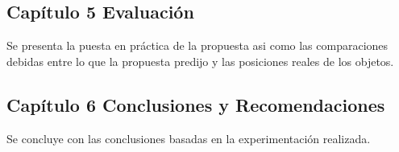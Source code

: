 \subsection{Cap\'itulo 5 Evaluaci\'on}
Se presenta la puesta en pr\'actica de la propuesta asi como las comparaciones debidas entre lo que la propuesta predijo y las posiciones reales de los objetos.
\subsection{Cap\'itulo 6 Conclusiones y Recomendaciones}
Se concluye con las conclusiones basadas en la experimentaci\'on realizada.